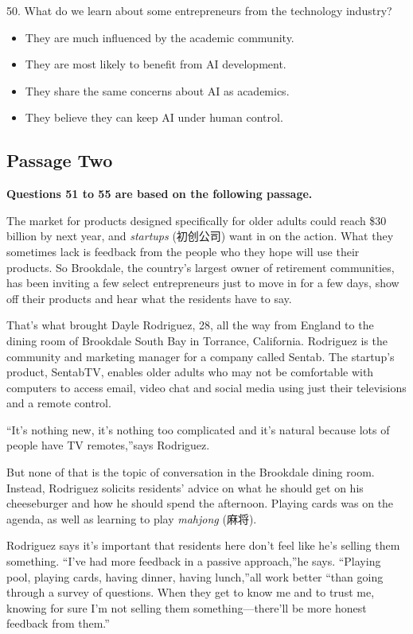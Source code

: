 \documentclass[UTF8,11pt]{ctexart}
\begin{document}
50. What do we learn about some entrepreneurs from the technology industry?


\begin{itemize}[leftmargin=2em,itemsep=.2em,topsep=.4em]\item[A.] They are much influenced by the academic community.
\item[B.] They are most likely to benefit from AI development.
\item[C.] They share the same concerns about AI as academics.
\item[D.] They believe they can keep AI under human control.
\end{itemize}

\subsection*{\textbf{Passage Two}}


\textbf{Questions 51 to 55 are based on the following passage.}


The market for products designed specifically for older adults could reach \$30 billion by next year, and \textit{startups} (初创公司) want in on the action. What they sometimes lack is feedback from the people who they hope will use their products. So Brookdale, the country’s largest owner of retirement communities, has been inviting a few select entrepreneurs just to move in for a few days, show off their products and hear what the residents have to say.


That’s what brought Dayle Rodriguez, 28, all the way from England to the dining room of Brookdale South Bay in Torrance, California. Rodriguez is the community and marketing manager for a company called Sentab. The startup’s product, SentabTV, enables older adults who may not be comfortable with computers to access email, video chat and social media using just their televisions and a remote control.


“It’s nothing new, it’s nothing too complicated and it’s natural because lots of people have TV remotes,”says Rodriguez.


But none of that is the topic of conversation in the Brookdale dining room. Instead, Rodriguez solicits residents’ advice on what he should get on his cheeseburger and how he should spend the afternoon. Playing cards was on the agenda, as well as learning to play\textit{ mahjong} (麻将).


Rodriguez says it’s important that residents here don’t feel like he’s selling them something. “I’ve had more feedback in a passive approach,”he says. “Playing pool, playing cards, having dinner, having lunch,”all work better “than going through a survey of questions. When they get to know me and to trust me, knowing for sure I’m not selling them something—there’ll be more honest feedback from them.”
\end{document}

